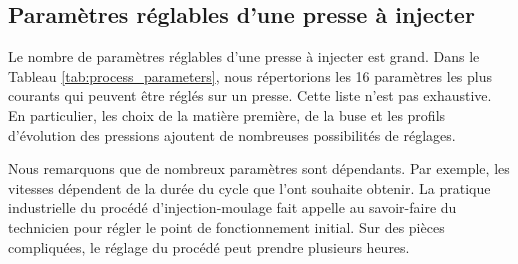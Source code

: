 \subsection{Paramètres réglables d'une presse à injecter} \label{subsec:process_parameters}
Le nombre de paramètres réglables d'une presse à injecter est grand.
Dans le Tableau \ref{tab:process_parameters}, nous répertorions les 16 paramètres les plus courants qui peuvent être réglés sur un presse.
Cette liste n'est pas exhaustive.
En particulier, les choix de la matière première, de la buse et les profils d'évolution des pressions ajoutent de nombreuses possibilités de réglages.

Nous remarquons que de nombreux paramètres sont dépendants.
Par exemple, les vitesses dépendent de la durée du cycle que l'ont souhaite obtenir.
La pratique industrielle du procédé d'injection-moulage fait appelle au savoir-faire du technicien pour régler le point de fonctionnement initial.
Sur des pièces compliquées, le réglage du procédé peut prendre plusieurs heures.

